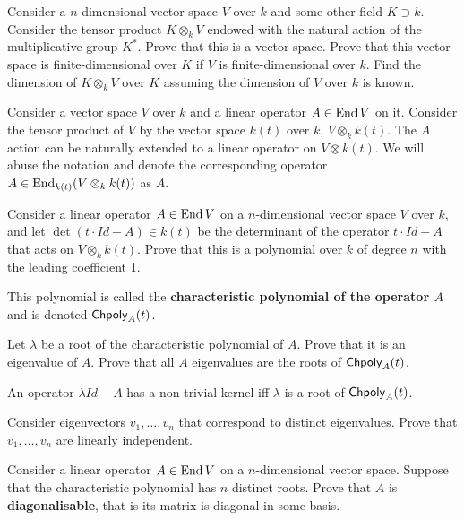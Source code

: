 \documentclass[12pt]{article}
\begin{document}
\begin{zadacha}
Consider a $n$-dimensional vector space $V$ over $k$ and some other
field $K\supset k$. Consider the tensor product $K\otimes_k V$
endowed with the natural action of the multiplicative group $K^*$.
Prove that this is a vector space.  Prove that this vector space is
finite-dimensional over $K$ if $V$ is finite-dimensional over
$k$. Find the dimension of $K\otimes_k V$ over $K$ assuming the
dimension of $V$ over $k$ is known.
\end{zadacha}

Consider a vector space $V$ over $k$ and a linear operator $A\in \operatorname{End}
V$ on it.  Consider the tensor product of $V$ by the vector space
$k(t)$ over $k$, $V\otimes_k k(t)$.  The $A$ action can be naturally
extended to a linear operator on $V\otimes k(t)$. We will abuse the
notation and denote the corresponding operator 
$A\in \operatorname{End}_{k(t)} (V\otimes_k k(t))$ as $A$.

\begin{zadacha}[!]
Consider a linear operator $A\in \operatorname{End} V$ on a $n$-dimensional vector
space $V$ over $k$, and let $\det(t\cdot Id
  -A)\in k(t)$ be the determinant of the operator  $t\cdot Id -A$ that
  acts on $V\otimes_k k(t)$. Prove that this is a polynomial over $k$
  of degree $n$ with the leading coefficient 1.
\end{zadacha}
 
\begin{opredelenie}
This polynomial is called the {\bf characteristic polynomial of the
  operator $A$} and is denoted  $\operatorname{\sf Chpoly}_A(t)$.
\end{opredelenie}

\begin{zadacha}[!]
Let $\lambda$ be a root of the characteristic polynomial of $A$.
Prove that it is an eigenvalue of $A$. Prove that all $A$ eigenvalues
are the roots of $\operatorname{\sf Chpoly}_A(t)$.
\end{zadacha}

\begin{ukazanie} An operator  $\lambda Id - A$ has a non-trivial
  kernel iff  $\lambda$ is a root of $\operatorname{\sf Chpoly}_A(t)$.
\end{ukazanie}


\begin{zadacha}
Consider eigenvectors $v_1,\dots,v_n$ that correspond to distinct
eigenvalues. Prove that $v_1,\dots,v_n$ are linearly independent.
\end{zadacha}

\begin{zadacha}
Consider a linear operator $A\in \operatorname{End} V$ on a $n$-dimensional
vector space. Suppose that the characteristic polynomial has  $n$
distinct roots. Prove that $A$ is {\bf diagonalisable}, that is its
matrix is diagonal in some basis.
\end{zadacha}
\end{document}
